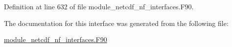 Definition at line 632 of file module\+\_\+netcdf\+\_\+nf\+\_\+interfaces.\+F90.



The documentation for this interface was generated from the following file\+:\begin{DoxyCompactItemize}
\item 
\hyperlink{module__netcdf__nf__interfaces_8F90}{module\+\_\+netcdf\+\_\+nf\+\_\+interfaces.\+F90}\end{DoxyCompactItemize}
